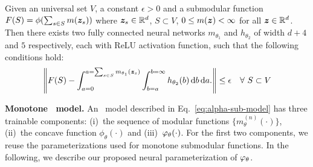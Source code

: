 \documentclass{article}
\newcommand{\xhdr}[1]{\noindent\textbf{#1.}}
\def\d{\mathrm{d}}
\begin{document}
\begin{proposition}
\label{prop:ua}
Given an universal set $V$, a constant $\epsilon>0$ and a submodular function $F(S) = \phi(\sum_{s\in S} m(\bm{z}_s))$  where $\bm{z}_s \in \mathbb{R}^d$, $S\subset V$, $0 \le m(\bm{z}) < \infty$ for all $\bm{z} \in \mathbb{R}^d$. Then there exists two fully connected neural networks   $m_{\theta_1}$  and $h_{\theta_2} $   of width $d+4$ and $5$ respectively, each with ReLU activation function, such that the following conditions hold:
\begin{align}
   \left\|F(S) -   \int_{a=0} ^{a=\sum_{s\in S}m_{\theta_1}(\zb_s)} \int_{b=a} ^{b=\infty} h_{\theta_2}(b) \, \d b \, \d a. \right\|    \le \epsilon \quad \forall \ S\subset V\label{eq:ua}
\end{align}
\end{proposition}


\xhdr{Monotone \asb\ model} An \asb\ model described in Eq.~\eqref{eq:alpha-sub-model} has three trainable components: (i)~the sequence of modular functions $\{m_{\theta} ^{(n)}(\cdot)\}$, (ii)~the concave function $\phi_{\theta}(\cdot)$ and (iii)~$\varphi_{\theta}(\cdot)$. For the first two components, we reuse the parameterizations used for monotone submodular functions.
In the following, we describe our proposed neural parameterization of $\varphi_{\theta}$.
\end{document}
